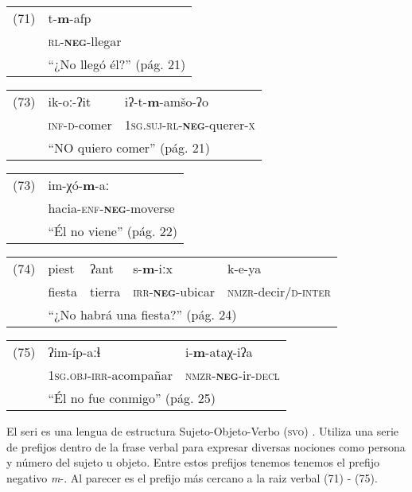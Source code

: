 {\setmainfont{Charis SIL} 

\begin{tabular}{ll}
(71) & t-\textbf{m}-afp \\
& \textsc{rl}-\textsc{\textbf{neg}}-llegar \\
& ``¿No llegó él?'' (pág. 21)
\end{tabular} \vspace{0.5cm}

\begin{tabular}{lll}
(73) & ik-oː-ʔit & iʔ-t-\textbf{m}-amšo-ʔo \\
& \textsc{inf-d}-comer & \textsc{1sg.suj-rl-\textbf{neg}-}querer-\textsc{x} \\
& \multicolumn{2}{l}{``NO quiero comer'' (pág. 21)}
\end{tabular} \vspace{0.5cm}

\begin{tabular}{ll}
(73) & im-χó-\textbf{m}-aː \\
& hacia-\textsc{enf-\textbf{neg}}-moverse \\
& ``Él no viene'' (pág. 22)
\end{tabular} \vspace{0.5cm}

\begin{tabular}{lllll}
(74) & piest & ʔant & s-\textbf{m}-iːx & k-e-ya  \\
& fiesta & tierra & \textsc{irr-\textbf{neg}}-ubicar & \textsc{nmzr}-decir/\textsc{d-inter} \\
& \multicolumn{4}{l}{``¿No habrá una fiesta?'' (pág. 24)}
\end{tabular} \vspace{0.5cm}

\begin{tabular}{lll}
(75) & ʔim-íp-aːɬ & i-\textbf{m}-ataχ-iʔa \\
& \textsc{1sg.obj-irr}-acompañar & \textsc{nmzr-\textbf{neg}-}ir-\textsc{decl}\\
& \multicolumn{2}{l}{``Él no fue conmigo'' (pág. 25)}
\end{tabular} \vspace{0.5cm}

}

El seri es una lengua de estructura Sujeto-Objeto-Verbo (\textsc{svo}) \textcolor{MidnightBlue}{\citep{Seri}}. Utiliza una serie de prefijos dentro de la frase verbal para expresar diversas nociones como persona y número del sujeto u objeto. Entre estos prefijos tenemos tenemos el prefijo negativo {\setmainfont{Charis SIL} \textit{m}-}. Al parecer es el prefijo más cercano a la raiz verbal (71) - (75).